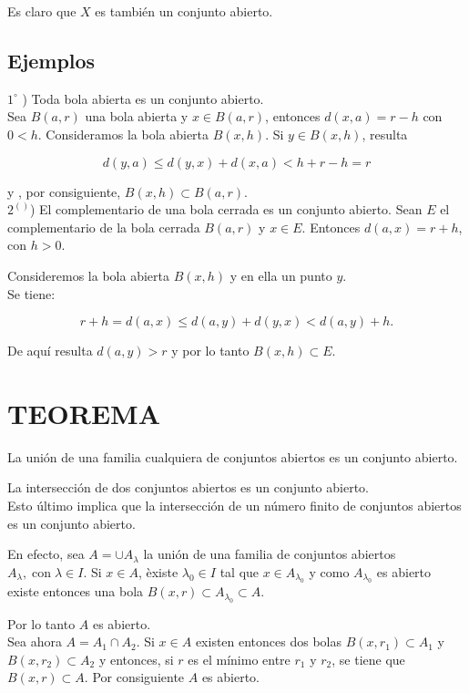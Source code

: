 \documentclass[10pt]{article}
\theoremstyle{plain}
\theoremstyle{definition}
\theoremstyle{remark}
\begin{document}
Es claro que $X$ es también un conjunto abierto.

\subsection*{Ejemplos}
$1^{\circ}$ ) Toda bola abierta es un conjunto abierto.\\
Sea $B(a, r)$ una bola abierta y $x \in B(a, r)$, entonces $d(x, a)=r-h$ con $0<h$. Consideramos la bola abierta $B(x, h)$. Si $y \in B(x, h)$, resulta

$$
d(y, a) \leqslant d(y, x)+d(x, a)<h+r-h=r
$$

y , por consiguiente, $B(x, h) \subset B(a, r)$.\\
$2^{()}$) El complementario de una bola cerrada es un conjunto abierto. Sean $E$ el complementario de la bola cerrada $B(a, r)$ y $x \in E$. Entonces $d(a, x)=r+h$, con $h>0$.

Consideremos la bola abierta $B(x, h)$ y en ella un punto $y$.\\
Se tiene:

$$
r+h=d(a, x) \leqslant d(a, y)+d(y, x)<d(a, y)+h .
$$

De aquí resulta $d(a, y)>r$ y por lo tanto $B(x, h) \subset E$.

\section*{TEOREMA}
La unión de una familia cualquiera de conjuntos abiertos es un conjunto abierto.

La intersección de dos conjuntos abiertos es un conjunto abierto.\\
Esto último implica que la intersección de un número finito de conjuntos abiertos es un conjunto abierto.

En efecto, sea $A=\cup A_{\lambda}$ la unión de una familia de conjuntos abiertos $A_{\lambda}, \operatorname{con} \lambda \in I$. Si $x \in A$, èxiste $\lambda_{0} \in I$ tal que $x \in A_{\lambda_{0}}$ y como $A_{\lambda_{0}}$ es abierto existe entonces una bola $B(x, r) \subset A_{\lambda_{0}} \subset A$.

Por lo tanto $A$ es abierto.\\
Sea ahora $A=A_{1} \cap A_{2}$. Si $x \in A$ existen entonces dos bolas $B\left(x, r_{1}\right) \subset A_{1}$ y $B\left(x, r_{2}\right) \subset A_{2}$ y entonces, si $r$ es el mínimo entre $r_{1}$ y $r_{2}$, se tiene que $B(x, r) \subset A$. Por consiguiente $A$ es abierto.
\end{document}
